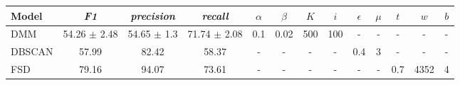 \begin{tabular}{|l|cccccccccccc|}
\hline
\textbf{Model} &       \textit{F1} & \textit{precision} &   \textit{recall} & $\alpha$ & $\beta$ &  $K$ &  $i$ & $\epsilon$ & $\mu$ &  $t$ &   $w$ & $b$ \\
\hline
           DMM &  54.26 $\pm$ 2.48 &    54.65 $\pm$ 1.3 &  71.74 $\pm$ 2.08 &      0.1 &    0.02 &  500 &  100 &          - &     - &    - &     - &   - \\
        DBSCAN &             57.99 &              82.42 &             58.37 &        - &       - &    - &    - &        0.4 &     3 &    - &     - &   - \\
           FSD &             79.16 &              94.07 &             73.61 &        - &       - &    - &    - &          - &     - &  0.7 &  4352 &   4 \\
\hline
\end{tabular}
